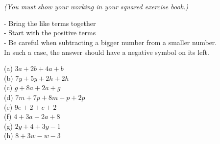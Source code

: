 \documentclass{article}
\date{}
\begin{document}
\fontsize{13}{15} \selectfont %

\begin{center}
  \qquad \\ 
\end{center} \\ 

\begin{center}
\vspace*{5pt} 
\textit{(You must show your working in your squared exercise book.)  }
\vspace{5pt}
\end{center}
\vspace{10pt}

\begin{flushleft}
- Bring the like terms together  \\ 
- Start with the positive terms \\
- Be careful when subtracting a bigger number from a smaller number. \\
\quad In such a  case, the answer should have a negative symbol on its left.  \\  
\end{flushleft}
\vspace{10pt}

(a) \quad  \( 3a + 2b + 4a + b \) \\ 

(b) \quad \( 7y + 5y + 2h + 2h  \) \\

(c) \quad \( g + 8a + 2a + g \) \\

(d) \quad \( 7m + 7p + 8m + p + 2p \) \\ 

(e) \quad \( 9e + 2 + e + 2  \) \\

(f) \quad \( 4 + 3a + 2a + 8 \) \\

(g) \quad \( 2y + 4 + 3y - 1  \) \\

(h) \quad \( 8 + 3w - w - 3  \) \\
\end{document}
